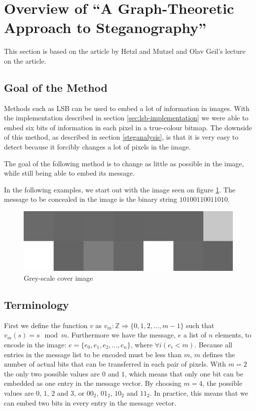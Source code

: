 \clearpage
\section{Overview of ``A Graph-Theoretic Approach to Steganography''}
\label{sec:graphtheory}
{\footnotesize This section is based on the article by Hetzl and Mutzel\citep{hetzl_2005} and Olav Geil's lecture on the article.}

\subsection{Goal of the Method}
Methods such as LSB can be used to embed a lot of information in images. 
With the implementation described in section \ref{sec:lsb-implementation} we were able to embed six bits of information in each pixel in a true-colour bitmap. 
The downside of this method, as described in section \ref{steganalysis}, is that it is very easy to detect because it forcibly changes a lot of pixels in the image. 

The goal of the following method is to change as little as possible in the image, while still being able to embed its message.

In the following examples, we start out with the image seen on figure \ref{fig:startingImage}.
The message to be concealed in the image is the binary string $10100110011010$.

\begin{figure}[h!]
	\centering
	\includegraphics[width=.4\textwidth, frame]{figures/pixelgrid.png}
	\caption{Grey-scale cover image}
	\label{fig:startingImage}
\end{figure}

\subsection{Terminology}
First we define the function $v$ as $ v_m: \mathds{Z} \Rightarrow \{0,1,2,\ldots,m-1\} $ such that $ v_m(s) = s \mod m $. 
Furthermore we have the message, $e$ a list of $n$ elements, to encode in the image: $e = \{ e_0, e_1, e_2, \ldots, e_n \}$, where $\forall i\left( e_i < m \right)$. 
Because all entries in the message list to be encoded must be less than $m$, $m$ defines the number of actual bits that can be transferred in each pair of pixels. With $m = 2$ the only two possible values are $0$ and $1$, which means that only one bit can be embedded as one entry in the message vector.
By choosing $m = 4$, the possible values are $0$, $1$, $2$ and $3$, or $00_2$, $01_2$, $10_2$ and $11_2$.
In practice, this means that we can embed two bits in every entry in the message vector. 

